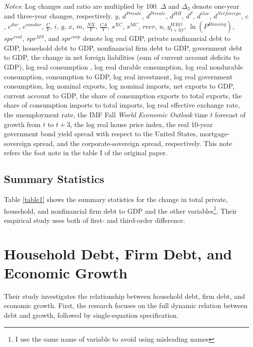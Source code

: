 \documentclass{ltjarticle}
\begin{document}
\begin{table}[hbtp]
\begin{tablenotes}
        \item \textit{Notes}: Log changes and ratio are multiplied by 100. $\Delta$ and $\Delta_{3}$ denote one-year and three-year changes, respectively. $y$, $d^{Private}$, $d^{Private}$, $d^{HH}$, $d^{F}$, $d^{Gov}$, $d^{Netforeign}$, $c$, $c^{dur}$, $c^{nondur}$, $\frac{C}{Y}$, $i$, $g$, $x$, $m$, $\frac{NX}{Y}$, $\frac{CA}{Y}$, $s^{XC}$, $s^{MC}$, $reer$, $u$,  $y_{t+3|t}^{WEO}$, $\ln(P^{Housing})$, $spr^{real}$, $spr^{MS}$, and $spr^{corp}$ denote log real GDP, private nonfinancial debt to GDP, household debt to GDP, nonfinancial firm debt to GDP, government debt to GDP, the change in net foreign liabilities (sum of current account deficits to GDP), log real consumption ,  log real durable consumption, log real nondurable consumption, consumption to GDP, log real investment, log real government consumption, log nominal exports, log nominal imports, net exports to GDP, current account to GDP, the share of consumption exports to total exports, the share of consumption imports to total imports, log real effective exchange rate, the unemployment rate, the IMF Fall \textit{World Economic Outlook} time $t$ forecast of growth from $t$ to $t+3$, the log real house price index, the real 10-year government bond yield spread with respect to the United States, mortgage-sovereign spread, and the corporate-sovereign spread, respectively. This note refers the foot note in the table I of the original paper.
    \end{tablenotes}
\end{table}

\subsection{Summary Statistics}
Table \ref{table1} shows the summary statistics for the change in total private, household, and nonfinancial firm debt to GDP and the other variables\footnote{I use the same name of variable to avoid using misleading names}. Their empirical study uses both of first- and third-order difference.

\section{Household Debt, Firm Debt, and Economic Growth}
Their study investigates the relationship between household debt, firm debt, and economic growth. First, the research focuses on the full dynamic relation between debt and growth, followed by single-equation specification.
\end{document}
